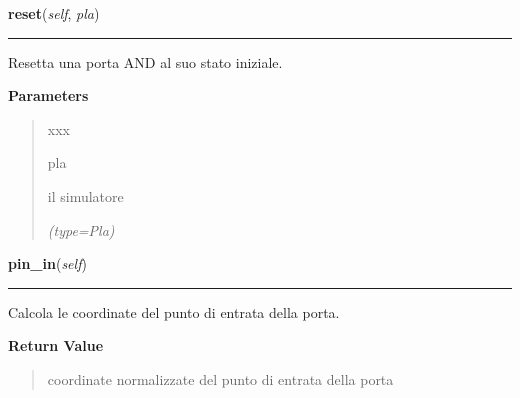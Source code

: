     \label{component:And:reset}

    \vspace{0.5ex}

\hspace{.8\funcindent}\begin{boxedminipage}{\funcwidth}

    \raggedright \textbf{reset}(\textit{self}, \textit{pla})

    \vspace{-1.5ex}

    \rule{\textwidth}{0.5\fboxrule}
\setlength{\parskip}{2ex}
    Resetta una porta AND al suo stato iniziale.

\setlength{\parskip}{1ex}
      \textbf{Parameters}
      \vspace{-1ex}

      \begin{quote}
        \begin{Ventry}{xxx}

          \item[pla]

          il simulatore

            {\it (type=Pla)}

        \end{Ventry}

      \end{quote}

    \end{boxedminipage}

    \label{component:And:pin_in}

    \vspace{0.5ex}

\hspace{.8\funcindent}\begin{boxedminipage}{\funcwidth}

    \raggedright \textbf{pin\_in}(\textit{self})

    \vspace{-1.5ex}

    \rule{\textwidth}{0.5\fboxrule}
\setlength{\parskip}{2ex}
    Calcola le coordinate del punto di entrata della porta.

\setlength{\parskip}{1ex}
      \textbf{Return Value}
    \vspace{-1ex}

      \begin{quote}
      coordinate normalizzate del punto di entrata della porta

      \end{quote}

    \end{boxedminipage}

